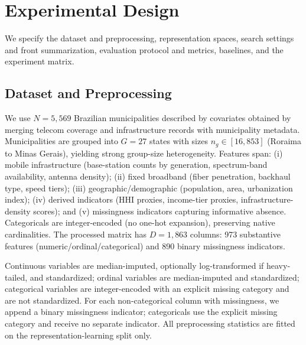 \documentclass[10pt,journal]{IEEEtran}
\newcommand{\datasetN}{5{,}569}
\newcommand{\1}{\mathbf{1}}
\theoremstyle{ieeethm}
\begin{document}
\section{Experimental Design}
\label{sec:exp_eval}

We specify the dataset and preprocessing, representation spaces, search settings and front summarization, evaluation protocol and metrics, baselines, and the experiment matrix.

\subsection{Dataset and Preprocessing}
\label{subsec:dataset}

We use $N=\datasetN$ Brazilian municipalities described by covariates obtained by merging telecom coverage and infrastructure records \cite{anatelEstacoesLicenciadasSMP,anatelCoberturaMovel,ibgeLocalidades,ibgePopEst2025} with municipality metadata. Municipalities are grouped into $G=27$ states with sizes $n_g\in[16,853]$ (Roraima to Minas Gerais), yielding strong group-size heterogeneity. Features span: (i) mobile infrastructure (base-station counts by generation, spectrum-band availability, antenna density); (ii) fixed broadband (fiber penetration, backhaul type, speed tiers); (iii) geographic/demographic (population, area, urbanization index); (iv) derived indicators (HHI proxies, income-tier proxies, infrastructure-density scores); and (v) missingness indicators capturing informative absence. Categoricals are integer-encoded (no one-hot expansion), preserving native cardinalities. The processed matrix has $D=1{,}863$ columns: 973 substantive features (numeric/ordinal/categorical) and 890 binary missingness indicators.

Continuous variables are median-imputed, optionally log-transformed if heavy-tailed, and standardized; ordinal variables are median-imputed and standardized; categorical variables are integer-encoded with an explicit missing category and are not standardized. For each non-categorical column with missingness, we append a binary missingness indicator; categoricals use the explicit missing category and receive no separate indicator. All preprocessing statistics are fitted on the representation-learning split only.
\end{document}
